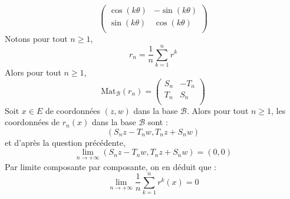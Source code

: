 \documentclass[a4paper,twoside,french,11pt]{VcCours}
\begin{document}
\begin{enumerate}
\begin{itemize}
$$\begin{pmatrix}
\cos(k\theta) & - \sin(k\theta) \\
\sin(k\theta) & \cos(k\theta) \\
\end{pmatrix}$$
Notons pour tout $n \geq 1$,
$$ r_n = \dfrac{1}{n} \sum_{k=1}^n r^k$$
Alors pour tout $n \geq 1$,
$$ \textrm{Mat}_{\mathcal{B}}(r_n) = \begin{pmatrix}
S_n & -T_n \\
T_n & S_n \\
\end{pmatrix}$$
Soit $x \in E$ de coordonnées $(z,w)$ dans la base $\mathcal{B}$. Alors pour tout $n \geq 1$, les coordonnées de $r_n(x)$ dans la base $\mathcal{B}$ sont :
$$ (S_n z - T_n w, T_n z + S_n w)$$
et d'après la question précédente, 
$$ \lim_{n \rightarrow + \infty} (S_n z - T_n w, T_n z + S_n w) = (0,0)$$
Par limite composante par composante, on en déduit que :
$$ \lim_{n \rightarrow + \infty} \dfrac{1}{n} \sum_{k=1}^n r^k(x) = 0$$


\end{itemize}
\end{enumerate}
\end{document}
